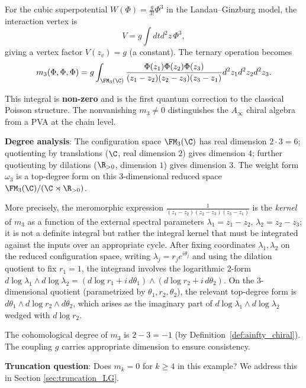 \begin{example}[Landau--Ginzburg Cubic: $m_3$ from $W = \Phi^3$]
\label{ex:m3_LG_cubic}
For the cubic superpotential $W(\Phi) = \frac{g}{3!} \Phi^3$ in the Landau--Ginzburg model, the interaction vertex is
\[
V = g \int dt d^2z \, \Phi^3,
\]
giving a vertex factor $V(z_v) = g$ (a constant). The ternary operation becomes
\[
m_3(\Phi, \Phi, \Phi) = g \int_{\FM_3(\C)} \frac{\Phi(z_1) \Phi(z_2) \Phi(z_3)}{(z_1 - z_2)(z_2 - z_3)(z_3 - z_1)} d^2z_1 d^2z_2 d^2z_3.
\]

This integral is \textbf{non-zero} and is the first quantum correction to the classical Poisson structure. The nonvanishing $m_3 \neq 0$ distinguishes the $A_\infty$ chiral algebra from a PVA at the chain level.

\textbf{Degree analysis}: The configuration space $\FM_3(\C)$ has real dimension $2 \cdot 3 = 6$; quotienting by translations ($\C$, real dimension $2$) gives dimension $4$; further quotienting by dilations ($\R_{>0}$, dimension $1$) gives dimension $3$. The weight form $\omega_3$ is a top-degree form on this $3$-dimensional reduced space $\FM_3(\C)/(\C \rtimes \R_{>0})$.

More precisely, the meromorphic expression $\frac{1}{(z_1-z_2)(z_2-z_3)(z_3-z_1)}$ is the \emph{kernel} of $m_3$ as a function of the external spectral parameters $\lambda_1 = z_1 - z_2$, $\lambda_2 = z_2 - z_3$; it is not a definite integral but rather the integral kernel that must be integrated against the inputs over an appropriate cycle. After fixing coordinates $\lambda_1, \lambda_2$ on the reduced configuration space, writing $\lambda_j = r_j e^{i\theta_j}$ and using the dilation quotient to fix $r_1 = 1$, the integrand involves the logarithmic $2$-form $d\log\lambda_1 \wedge d\log\lambda_2 = (d\log r_1 + i\,d\theta_1)\wedge(d\log r_2 + i\,d\theta_2)$. On the $3$-dimensional quotient (parametrized by $\theta_1, r_2, \theta_2$), the relevant top-degree form is $d\theta_1 \wedge d\log r_2 \wedge d\theta_2$, which arises as the imaginary part of $d\log\lambda_1 \wedge d\log\lambda_2$ wedged with $d\log r_2$.

The cohomological degree of $m_3$ is $2 - 3 = -1$ (by Definition~\ref{def:ainfty_chiral}). The coupling $g$ carries appropriate dimension to ensure consistency.

\textbf{Truncation question}: Does $m_k = 0$ for $k \geq 4$ in this example? We address this in Section \ref{sec:truncation_LG}.
\end{example}


